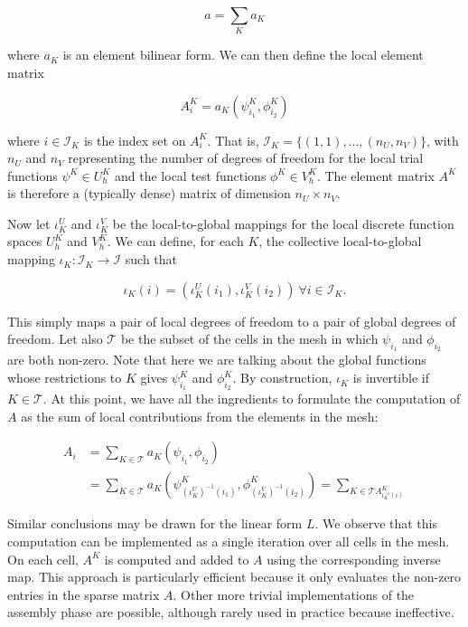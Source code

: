 \begin{equation}
a = \sum_{K} a_K
\end{equation}

where $a_K$ is an element bilinear form. We can then define the local element matrix

\begin{equation}
A_i^K = a_K (\psi_{i_1}^K, \phi_{i_2}^K)
\end{equation}

where $i \in \mathcal{I}_K$ is the index set on $A_i^K$. That is, $\mathcal{I}_K = \lbrace (1,1), ..., (n_U, n_V) \rbrace$, with $n_U$ and $n_V$ representing the number of degrees of freedom for the local trial functions $\psi^K \in U_h^K$ and the local test functions $\phi^K \in V_h^K$. The element matrix $A^K$ is therefore a (typically dense) matrix of dimension $n_U \times n_V$.

Now let $\iota_K^U$ and $\iota_K^V$ be the local-to-global mappings for the local discrete function spaces $U_h^K$ and $V_h^K$. We can define, for each $K$, the collective local-to-global mapping $\iota_K : \mathcal{I}_K \rightarrow \mathcal{I}$ such that

\begin{equation}
\iota_K (i) = (\iota_K^U(i_1), \iota_K^V(i_2))\ \forall i \in \mathcal{I}_K.
\end{equation}

This simply maps a pair of local degrees of freedom to a pair of global degrees of freedom. Let also $\mathcal{T}$ be the subset of the cells in the mesh in which $\psi_{i_1}$ and $\phi_{i_2}$ are both non-zero. Note that here we are talking about the global functions whose restrictions to $K$ gives $\psi_{i_1}^K$ and $\phi_{i_2}^K$. By construction, $\iota_K$ is invertible if $K \in \mathcal{T}$. At this point, we have all the ingredients to formulate the computation of $A$ as the sum of local contributions from the elements in the mesh:

\begin{equation}
\begin{split}
A_i & = \sum_{K \in \mathcal{T}} a_K (\psi_{i_1},\phi_{i_2}) \\
& = \sum_{K \in \mathcal{T}} a_K(\psi_{(\iota_K^U)^{-1}(i_1)}^K, \phi_{(\iota_K^V)^{-1}(i_2)}^K) = \sum_{K \in \mathcal{T} A_{\iota_K^{-1}(i)}^K}
\end{split}
\end{equation} 

Similar conclusions may be drawn for the linear form $L$. We observe that this computation can be implemented as a single iteration over all cells in the mesh. On each cell, $A^K$ is computed and added to $A$ using the corresponding inverse map. This approach is particularly efficient because it only evaluates the non-zero entries in the sparse matrix $A$. Other more trivial implementations of the assembly phase are possible, although rarely used in practice because ineffective. 

